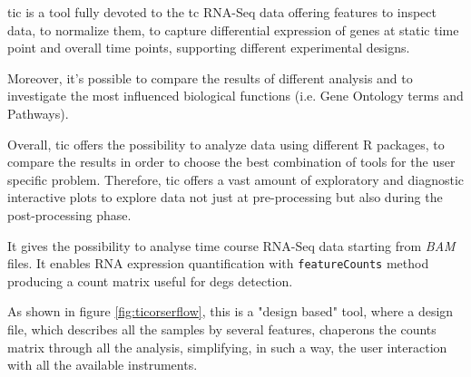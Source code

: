 \gls{tic} is a tool fully devoted to the \gls{tc} RNA-Seq data offering features to inspect data, to normalize them, to capture differential expression of genes at static time point and overall time points, supporting different experimental designs.

Moreover, it's possible to compare the results of different analysis and to investigate the most influenced biological functions (i.e. Gene Ontology terms and Pathways). 

Overall, \gls{tic} offers the possibility to analyze data using different R packages, to compare the results in order to choose the best combination of tools for the user specific problem. Therefore, \gls{tic} offers a vast amount of exploratory and diagnostic interactive plots to explore data not just at pre-processing but also during the post-processing phase. 


It gives the possibility to analyse time course RNA-Seq data starting from \textit{BAM} files.
It enables RNA expression quantification with \lstinline!featureCounts! method producing a count matrix useful for \glspl{deg} detection.

As shown in figure \ref{fig:ticorserflow}, this is a "design based" tool, where a design file, which describes all the samples by several features, chaperons the counts matrix through all the analysis, simplifying, in such a way, the user interaction with all the available instruments.

